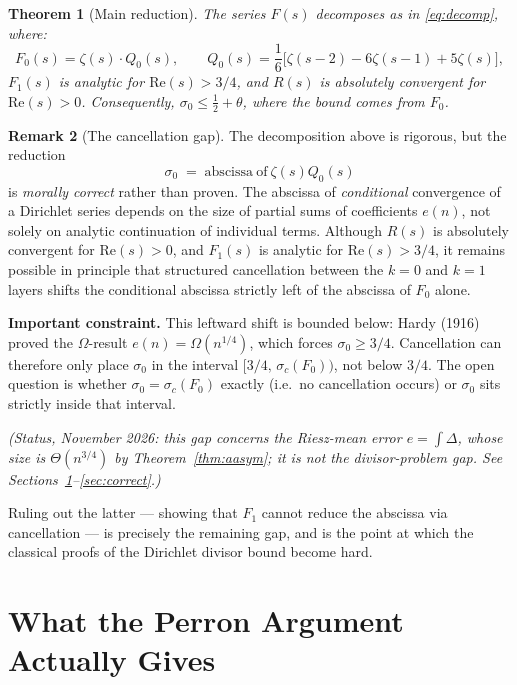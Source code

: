 \documentclass[12pt]{article}
\newtheorem{theorem}{Theorem}
\theoremstyle{definition}
\newtheorem{remark}[theorem]{Remark}
\begin{document}
\begin{theorem}[Main reduction]
\label{thm:main}
The series $F(s)$ decomposes as in \eqref{eq:decomp}, where:
\begin{equation}
    \boxed{F_0(s) = \zeta(s)\cdot Q_0(s),
    \qquad Q_0(s) = \frac{1}{6}\bigl[\zeta(s-2)-6\zeta(s-1)+5\zeta(s)\bigr],}
    \label{eq:mainbox}
\end{equation}
$F_1(s)$ is analytic for $\mathrm{Re}(s) > 3/4$, and $R(s)$ is absolutely
convergent for $\mathrm{Re}(s) > 0$.  Consequently,
$\sigma_0 \le \tfrac{1}{2}+\theta$, where the bound comes from $F_0$.
\end{theorem}

\begin{remark}[The cancellation gap]
\label{rem:gap}
The decomposition above is rigorous, but the reduction
\[
    \sigma_0 \;=\; \mathrm{abscissa\ of\ } \zeta(s)Q_0(s)
\]
is \emph{morally correct} rather than proven.
The abscissa of \emph{conditional} convergence of a Dirichlet series depends
on the size of partial sums of coefficients $e(n)$, not solely on analytic
continuation of individual terms.  Although $R(s)$ is absolutely convergent
for $\mathrm{Re}(s)>0$, and $F_1(s)$ is analytic for $\mathrm{Re}(s)>3/4$,
it remains possible in principle that structured cancellation between the
$k=0$ and $k=1$ layers shifts the conditional abscissa strictly left of the
abscissa of $F_0$ alone.

\textbf{Important constraint.}  This leftward shift is bounded below:
Hardy (1916) proved the $\Omega$-result $e(n) = \Omega(n^{1/4})$, which
forces $\sigma_0 \ge 3/4$.  Cancellation can therefore only place $\sigma_0$
in the interval $[3/4,\, \sigma_c(F_0))$, not below $3/4$.
The open question is whether $\sigma_0 = \sigma_c(F_0)$ exactly (i.e.\
no cancellation occurs) or $\sigma_0$ sits strictly inside that interval.

\emph{(Status, November 2026: this gap concerns the Riesz-mean error $e=\int\Delta$, whose
size is $\Theta(n^{3/4})$ by Theorem~\ref{thm:aasym}; it is not the divisor-problem gap.  See
Sections~\ref{sec:riesz}--\ref{sec:correct}.)}

Ruling out the latter — showing that $F_1$ cannot reduce the abscissa via
cancellation — is precisely the remaining gap, and is the point at which
the classical proofs of the Dirichlet divisor bound become hard.
\end{remark}

\section{What the Perron Argument Actually Gives}\label{sec:riesz}
\end{document}
